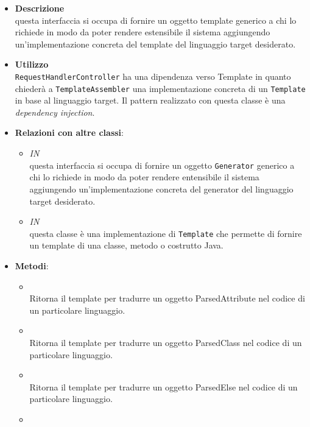 \begin{itemize}
\item \textbf{Descrizione}\\
questa interfaccia si occupa di fornire un oggetto template generico a chi lo richiede in modo da poter rendere estensibile il sistema aggiungendo un'implementazione concreta del template del linguaggio target desiderato.
\item \textbf{Utilizzo}\\
\texttt{RequestHandlerController} ha una dipendenza verso Template in quanto chiederà a \texttt{TemplateAssembler} una implementazione concreta di un \texttt{Template} in base al linguaggio target. Il pattern realizzato con questa classe è una \emph{dependency injection}.
\item \textbf{Relazioni con altre classi}:
\begin{itemize}
\item \textit{IN} \hyperref[\nogloxy{swedesigner::server::generator::Generator}]{}\\
questa interfaccia si occupa di fornire un oggetto \texttt{Generator} generico a chi lo richiede in modo da poter rendere entensibile il sistema aggiungendo un'implementazione concreta del generator del linguaggio target desiderato.
\item \textit{IN} \hyperref[\nogloxy{swedesigner::server::template::java::JavaTemplate}]{}\\
questa classe è una implementazione di \texttt{Template} che permette di fornire un template di una classe, metodo o costrutto Java.
\end{itemize}
\item \textbf{Metodi}:
\begin{itemize}
\item {}
\\ Ritorna il template per tradurre un oggetto ParsedAttribute nel codice di un particolare linguaggio.
\item {}
\\ Ritorna il template per tradurre un oggetto ParsedClass nel codice di un particolare linguaggio.
\item {}
\\ Ritorna il template per tradurre un oggetto ParsedElse nel codice di un particolare linguaggio.
\item {}

\end{itemize}
\end{itemize}
